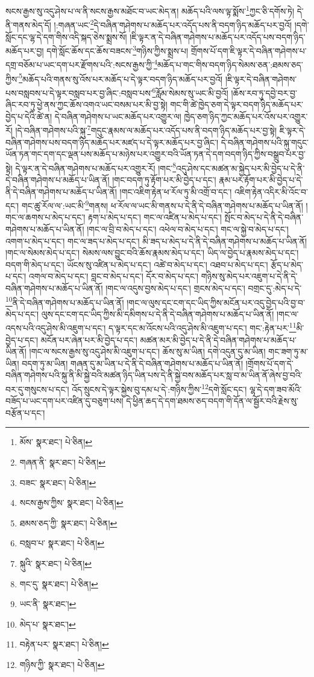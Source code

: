 སངས་རྒྱས་སུ་འདུ་ཤེས་པ་ལ་ནི་སངས་རྒྱས་མཐོང་བ་ཡང་མེད་ན། མཆོད་པའི་ལས་ལྟ་སྨོས་\footnote{མོས་  སྣར་ཐང་།  པེ་ཅིན། }ཀྱང་ཅི་དགོས་ཏེ། དེ་ནི་གནས་མེད་དོ། །:གཞན་ཡང་\footnote{གཞན་ནི་  སྣར་ཐང་།  པེ་ཅིན། }དེ་བཞིན་གཤེགས་པ་མཆོད་པར་འདོད་པས་ནི་བདག་ཉིད་མཆོད་པར་བྱའོ། །དགེ་སློང་དང་ལྷ་དེ་དག་གིས་འདི་སྐད་ཅེས་སྨྲས་སོ། །ཇི་ལྟར་ན་དེ་བཞིན་གཤེགས་པ་མཆོད་པར་འདོད་པས་བདག་ཉིད་མཆོད་པར་བྱ། དགེ་སློང་ཆོས་དང་ཆོས་བཟངས་\footnote{བཟང་  སྣར་ཐང་།  པེ་ཅིན། }གཉིས་ཀྱིས་སྨྲས་པ། གྲོགས་པོ་དག་ཇི་ལྟར་དེ་བཞིན་གཤེགས་པ་དགྲ་བཅོམ་པ་ཡང་དག་པར་རྫོགས་པའི་:སངས་རྒྱས་ཀྱི་\footnote{སངས་རྒྱས་ཀྱིས་  སྣར་ཐང་།  པེ་ཅིན། }མཆོད་པ་གང་གིས་བདག་ཉིད་སེམས་ཅན་:ཐམས་ཅད་ཀྱིས་\footnote{ཐམས་ཅད་ཀྱི་  སྣར་ཐང་།  པེ་ཅིན། }མཆོད་པའི་གནས་སུ་འོས་པར་མཆོད་པ་དེ་ལྟར་བདག་ཉིད་མཆོད་པར་བྱའོ། །ཇི་ལྟར་དེ་བཞིན་གཤེགས་པས་བསླབས་པ་དེ་ལྟར་བསླབ་པར་བྱ་ཞིང་:བསླབ་པས་\footnote{བསླབ་པ་  སྣར་ཐང་།  པེ་ཅིན། }རློམ་སེམས་སུ་ཡང་མི་བྱའོ། །ཆོས་རབ་ཏུ་དབྱེ་བར་བྱ་ཞིང་རབ་ཏུ་ཕྱེ་ནས་ཀྱང་ཆོས་འགའ་ཡང་བསམ་པར་མི་བྱ་སྟེ། གང་གི་ཚེ་ཁྱེད་ཅག་དེ་ལྟར་བདག་ཉིད་མཆོད་པར་བྱེད་པ་དེའི་ཚེ་ན། དེ་བཞིན་གཤེགས་པ་ཡང་མཆོད་པར་འགྱུར་ལ། ཁྱེད་ཅག་ཉིད་ཀྱང་མཆོད་པར་འོས་པར་འགྱུར་རོ། །དེ་བཞིན་གཤེགས་པའི་སྐུ་\footnote{སྐུའི་  སྣར་ཐང་།  པེ་ཅིན། }གདུང་རྣམས་ལ་མཆོད་པར་འདོད་པས་ནི་བདག་ཉིད་མཆོད་པར་བྱ་སྟེ། ཇི་ལྟར་དེ་བཞིན་གཤེགས་པས་བདག་ཉིད་མཆོད་པར་མཛད་པ་དེ་ལྟར་མཆོད་པར་བྱ་ཞིང་། དེ་བཞིན་གཤེགས་པའི་སྐུ་གདུང་ཡོན་ཏན་གང་དག་དང་ལྡན་པས་མཆོད་པ་མཉེས་པར་འགྱུར་བའི་ཡོན་ཏན་དེ་དག་བདག་ཉིད་ཀྱིས་བསྒྲུབ་པར་བྱ་སྟེ། དེ་ལྟར་ན་དེ་བཞིན་གཤེགས་པ་མཆོད་པར་འགྱུར་རོ། །གང་\footnote{གང་དུ་  སྣར་ཐང་།  པེ་ཅིན། }འདུ་ཤེས་དང་མཚན་མ་སྐྱེད་པར་མི་བྱེད་པ་དེ་ནི་དེ་བཞིན་གཤེགས་པ་མཆོད་པ་ཡིན་ནོ། །གང་བདག་ཏུ་རྟོག་པར་མི་བྱེད་པ་དང་། རྣམ་པར་རྟོག་པར་མི་བྱེད་པ་དེ་ནི་དེ་བཞིན་གཤེགས་པ་མཆོད་པ་ཡིན་ནོ། །གང་འཇིག་རྟེན་ཕ་རོལ་ཏུ་མི་འགྲོ་བ་དང་། འཇིག་རྟེན་འདིར་མི་འོང་བ་དང་། གང་ཚུ་རོལ་ལ་:ཡང་མི་\footnote{ཡང་ནི་  སྣར་ཐང་། }གནས། ཕ་རོལ་ལ་ཡང་མི་གནས་པ་དེ་ནི་དེ་བཞིན་གཤེགས་པ་མཆོད་པ་ཡིན་ནོ། །གང་ལ་ཆགས་པ་མེད་པ་དང་། རྟག་པ་མེད་པ་དང་། གང་ལ་འཛིན་པ་མེད་པ་དང་། སྤོང་བ་མེད་པ་དེ་ནི་དེ་བཞིན་གཤེགས་པ་མཆོད་པ་ཡིན་ནོ། །གང་ལ་བྲི་བ་མེད་པ་དང་། འཕེལ་བ་མེད་པ་དང་། གང་ལ་སྐྱེ་བ་མེད་པ་དང་། འགག་པ་མེད་པ་དང་། གང་ལ་ཟད་པ་མེད་པ་དང་། མི་ཟད་པ་མེད་པ་དེ་ནི་དེ་བཞིན་གཤེགས་པ་མཆོད་པ་ཡིན་ནོ། །གང་ལ་སེམས་མེད་པ་དང་། སེམས་ལས་བྱུང་བའི་ཆོས་རྣམས་མེད་པ་དང་། ཡིད་ལ་བྱེད་པ་རྣམས་མེད་པ་དང་། བདག་གི་མེད་པ་དང་། ཡོངས་སུ་འཛིན་པ་མེད་པ་དང་། འཚེ་བ་མེད་པ་དང་། འཐབ་པ་མེད་པ་དང་། རྩོད་པ་མེད་པ་དང་། འགལ་བ་མེད་པ་དང་། བླང་བ་མེད་པ་དང་། དོར་བ་མེད་པ་དང་། གཉིས་སུ་མེད་པར་འཇུག་པ་དེ་ནི་དེ་བཞིན་གཤེགས་པ་མཆོད་པ་ཡིན་ནོ། །གང་ལ་འདུས་བྱས་མེད་པ་དང་། གྲངས་མེད་པ་དང་། བགྲང་དུ་:མེད་པ་དེ་\footnote{མེད་པ་  སྣར་ཐང་། }ནི་དེ་བཞིན་གཤེགས་པ་མཆོད་པ་ཡིན་ནོ། །གང་ལ་ལུས་དང་ངག་དང་ཡིད་ཀྱིས་མངོན་པར་འདུ་བྱེད་པའི་བྱ་བ་མེད་པ་དང་། ལུས་དང་ངག་དང་ཡིད་ཀྱིས་མི་དམིགས་པ་དེ་ནི་དེ་བཞིན་གཤེགས་པ་མཆོད་པ་ཡིན་ནོ། །གང་ལ་འདས་པའི་འདུ་ཤེས་མི་འཇུག་པ་དང་། ད་ལྟར་དང་མ་འོངས་པའི་འདུ་ཤེས་མི་འཇུག་པ་དང་། གང་:རྟེན་པར་\footnote{བརྟེན་པར་  སྣར་ཐང་།  པེ་ཅིན། }མི་བྱེད་པ་དང་། མངོན་པར་ཞེན་པར་མི་བྱེད་པ་དང་། མཚན་མར་མི་བྱེད་པ་དེ་ནི་དེ་བཞིན་གཤེགས་པ་མཆོད་པ་ཡིན་ནོ། །གང་ལ་སངས་རྒྱས་སུ་འདུ་ཤེས་མི་འཇུག་པ་དང་། ཆོས་སུ་མ་ཡིན། དགེ་འདུན་དུ་མ་ཡིན། གང་ཟག་ཏུ་མ་ཡིན། བདག་ཏུ་མ་ཡིན། གཞན་དུ་མ་ཡིན་པ་དེ་ནི་དེ་བཞིན་གཤེགས་པ་མཆོད་པ་ཡིན་ནོ། །གྲོགས་པོ་དག་དེ་བཞིན་གཤེགས་པའི་སྐུ་ནི་མི་སྐྱེ་བའི་མཚན་ཉིད་ཡིན་པས་དེ་ནི་སྐྱེ་བས་མཆོད་པར་སླ་བ་མ་ཡིན་ནོ་ཞེས་བྱ་བའི་བར་དུ་གསུངས་པ་དང་། འོད་སྲུངས་དེ་ལྟར་སྐྱེས་བུ་དམ་པ་དེ་:གཉིས་ཀྱིས་\footnote{གཉིས་ཀྱི་  སྣར་ཐང་།  པེ་ཅིན། }དགེ་སློང་དང་། ལྷ་དེ་དག་ཟབ་མོའི་བཟོད་པ་ཡང་དག་པར་འཛིན་དུ་བཅུག་པས། དེ་ཕྱིན་ཆད་དེ་དག་ཐམས་ཅད་བདག་གི་དོན་ལ་སྦྱོར་བའི་རྗེས་སུ་བརྩོན་པ་དང་། 